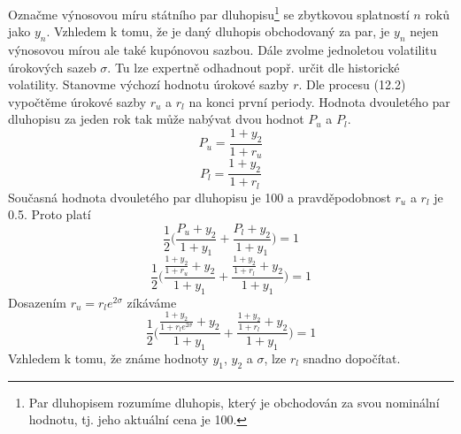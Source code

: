 \documentclass[a4paper]{book}
\begin{document}
Označme výnosovou míru státního par dluhopisu\footnote{Par dluhopisem rozumíme dluhopis, který je obchodován za svou nominální hodnotu, tj. jeho aktuální cena je 100.} se zbytkovou splatností $n$ roků jako $y_n$. Vzhledem k tomu, že je daný dluhopis obchodovaný za par, je $y_n$ nejen výnosovou mírou ale také kupónovou sazbou. Dále zvolme jednoletou volatilitu úrokových sazeb $\sigma$. Tu lze expertně odhadnout popř. určit dle historické volatility. Stanovme výchozí hodnotu úrokové sazby $r$. Dle procesu (12.2) vypočtěme úrokové sazby $r_u$ a $r_l$ na konci první periody. Hodnota dvouletého par dluhopisu za jeden rok tak může nabývat dvou hodnot $P_u$ a $P_l$.
\begin{equation*}
P_u = \frac{1 + y_2}{1 + r_u}
\end{equation*}
\begin{equation*}
P_l = \frac{1 + y_2}{1 + r_l}
\end{equation*}
Současná hodnota dvouletého par dluhopisu je 100 a pravděpodobnost $r_u$ a $r_l$ je 0.5. Proto platí
\begin{equation*}
\frac{1}{2}\Bigg( \frac{P_u + y_2}{1 + y_1} + \frac{P_l + y_2}{1 + y_1} \Bigg) = 1
\end{equation*}
\begin{equation*}
\frac{1}{2}\Bigg( \frac{\frac{1 + y_2}{1 + r_u} + y_2}{1 + y_1} + \frac{\frac{1 + y_2}{1 + r_l} + y_2}{1 + y_1} \Bigg) = 1
\end{equation*}
Dosazením $r_u = r_l e^{2 \sigma}$ zíkáváme
\begin{equation}
\frac{1}{2}\Bigg( \frac{\frac{1 + y_2}{1 + r_l e^{2 \sigma}} + y_2}{1 + y_1} + \frac{\frac{1 + y_2}{1 + r_l} + y_2}{1 + y_1}\Bigg) = 1
\end{equation}
Vzhledem k tomu, že známe hodnoty $y_1$, $y_2$ a $\sigma$, lze $r_l$ snadno dopočítat.
\end{document}

